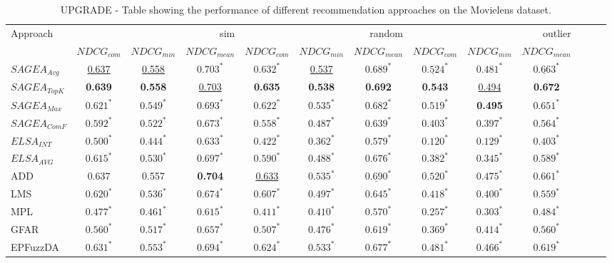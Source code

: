 \begin{table}
\caption{UPGRADE - Table showing the performance of different recommendation approaches on the Movielens dataset.}
\label{tab:overall}
\begin{tabular}{l|cccc|cccc|cccc}
\toprule
Approach & \multicolumn{3}{r}{sim} & \multicolumn{3}{r}{random} & \multicolumn{3}{r}{outlier} \\
 & $NDCG_{com}$ & $NDCG_{min}$ & $NDCG_{mean}$ & $NDCG_{com}$ & $NDCG_{min}$ & $NDCG_{mean}$ & $NDCG_{com}$ & $NDCG_{min}$ & $NDCG_{mean}$ \\
\midrule
$SAGEA_{Avg}$ & \underline{0.637} & \underline{0.558} & $0.703^*$ & $0.632^*$ & \underline{0.537} & $0.689^*$ & $\underline{0.524}^*$ & $0.481^*$ & $\underline{0.663}^*$ \\
$SAGEA_{TopK}$ & \textbf{0.639} & \textbf{0.558} & \underline{0.703} & \textbf{0.635} & \textbf{0.538} & \textbf{0.692} & \textbf{0.543} & \underline{0.494} & \textbf{0.672} \\
$SAGEA_{Max}$ & $0.621^*$ & $0.549^*$ & $0.693^*$ & $0.622^*$ & $0.535^*$ & $0.682^*$ & $0.519^*$ & \textbf{0.495} & $0.651^*$ \\
$SAGEA_{ComF}$ & $0.592^*$ & $0.522^*$ & $0.673^*$ & $0.558^*$ & $0.487^*$ & $0.639^*$ & $0.403^*$ & $0.397^*$ & $0.564^*$ \\
\midrule
$ELSA_{INT}$ & $0.500^*$ & $0.444^*$ & $0.633^*$ & $0.422^*$ & $0.362^*$ & $0.579^*$ & $0.120^*$ & $0.129^*$ & $0.403^*$ \\
$ELSA_{AVG}$ & $0.615^*$ & $0.530^*$ & $0.697^*$ & $0.590^*$ & $0.488^*$ & $0.676^*$ & $0.382^*$ & $0.345^*$ & $0.589^*$ \\
\midrule
ADD & 0.637 & 0.557 & \textbf{0.704} & \underline{0.633} & $0.535^*$ & $\underline{0.690}^*$ & $0.520^*$ & $0.475^*$ & $0.661^*$ \\
LMS & $0.620^*$ & $0.536^*$ & $0.674^*$ & $0.607^*$ & $0.497^*$ & $0.645^*$ & $0.418^*$ & $0.400^*$ & $0.559^*$ \\
MPL & $0.477^*$ & $0.461^*$ & $0.615^*$ & $0.411^*$ & $0.410^*$ & $0.570^*$ & $0.257^*$ & $0.303^*$ & $0.484^*$ \\
GFAR & $0.560^*$ & $0.517^*$ & $0.657^*$ & $0.507^*$ & $0.476^*$ & $0.619^*$ & $0.369^*$ & $0.414^*$ & $0.560^*$ \\
EPFuzzDA & $0.631^*$ & $0.553^*$ & $0.694^*$ & $0.624^*$ & $0.533^*$ & $0.677^*$ & $0.481^*$ & $0.466^*$ & $0.619^*$ \\
\bottomrule
\end{tabular}
\end{table}

